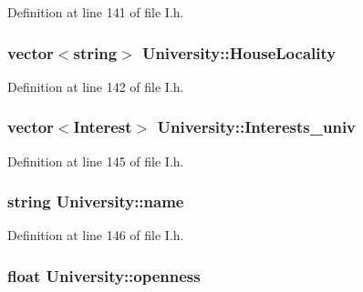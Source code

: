 \-Definition at line 141 of file \-I.\-h.

\hypertarget{classUniversity_a5573ac275c631e52884ebfad80d3f033}{
\subsubsection[{\-House\-Locality}]{\setlength{\rightskip}{0pt plus 5cm}vector$<$string$>$ {\bf \-University\-::\-House\-Locality}}}\label{classUniversity_a5573ac275c631e52884ebfad80d3f033}


\-Definition at line 142 of file \-I.\-h.

\hypertarget{classUniversity_aac51fce221b98b490edb88334e07b322}{
\subsubsection[{\-Interests\-\_\-univ}]{\setlength{\rightskip}{0pt plus 5cm}vector$<${\bf \-Interest}$>$ {\bf \-University\-::\-Interests\-\_\-univ}}}\label{classUniversity_aac51fce221b98b490edb88334e07b322}


\-Definition at line 145 of file \-I.\-h.

\hypertarget{classUniversity_a2a8af7dfd2ed7333922f6e2e94cd19a5}{
\subsubsection[{name}]{\setlength{\rightskip}{0pt plus 5cm}string {\bf \-University\-::name}}}\label{classUniversity_a2a8af7dfd2ed7333922f6e2e94cd19a5}


\-Definition at line 146 of file \-I.\-h.

\hypertarget{classUniversity_accc4ecb2a9e5f3b4fe0defa51e7aaa7b}{
\subsubsection[{openness}]{\setlength{\rightskip}{0pt plus 5cm}float {\bf \-University\-::openness}}}\label{classUniversity_accc4ecb2a9e5f3b4fe0defa51e7aaa7b}


